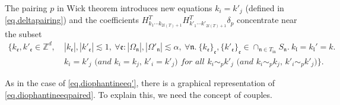 The pairing $p$ in Wick theorem introduces new equations $k_{i}=k'_{j}$ (defined in \eqref{eq.deltapairing}) and the coefficients $H^T_{k_1\cdots k_{2l(T)+1}} H^{T}_{k'_1\cdots k'_{2l(T)+1}} \delta_{p}$ concentrate near the subset 
\begin{equation}\label{eq.diophantineeqpaired}
\begin{split}
    \{k_{\mathfrak{e}}, k'_{\mathfrak{e}}\in \mathbb{Z}^d,\ &|k_{\mathfrak{e}}|, |k'_{\mathfrak{e}}|\lesssim 1,\ \forall \mathfrak{e}: |\Omega_{\mathfrak{n}}|,|\Omega'_{\mathfrak{n}}|\lesssim \alpha,\ \forall \mathfrak{n}. \ \{k_{\mathfrak{e}}\}_{\mathfrak{e}}, \{k'_{\mathfrak{e}}\}_{\mathfrak{e}}\in \cap_{\mathfrak{n}\in T_{\text{in}}} S_{\mathfrak{n}}.\ k_{\mathfrak{l}}=k_{\mathfrak{l}}'=k. \\
    &\textit{$k_{i}=k'_{j}$ (and $k_{i}=k_{j}$, $k'_{i}=k'_{j}$) for all $k_{i}\sim_{p}k'_{j}$ (and $k_{i}\sim_{p}k_{j}$, $k'_{i}\sim_{p}k'_{j}$)}\}.
\end{split}
\end{equation}

As in the case of \eqref{eq.diophantineeq'}, there is a graphical representation of \eqref{eq.diophantineeqpaired}. To explain this, we need the concept of couples.



